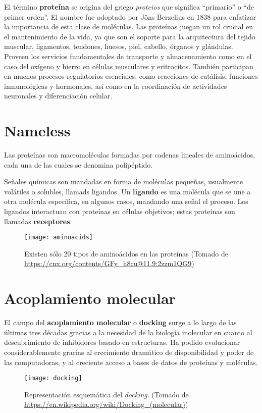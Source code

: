 El término \textbf{proteína} se origina del griego \textit{proteios}
que significa ``primario'' o ``de primer orden''. El nombre fue
adoptado por Jöns Berzelius en 1838 para enfatizar la importancia de
esta clase de moléculas. Las proteínas juegan un rol crucial en el
mantenimiento de la vida, ya que son el soporte para la arquitectura
del tejido muscular, ligamentos, tendones, huesos, piel, cabello,
órganos y glándulas. Proveen los servicios fundamentales de transporte
y almacenamiento como en el caso del oxígeno y hierro en células
musculares y eritrocitos. También participan en muchos procesos
regulatorios esenciales, como reacciones de catálisis, funciones
inmunológicas y hormonales, así como en la coordinación de actividades
neuronales y diferenciación celular.\cite{tamar}

\section{Nameless}
Las proteínas son macromoléculas formadas por cadenas lineales de
aminoácidos, cada una de las cuales se denomina polipéptido.

Señales químicas son mandadas en forma de moléculas pequeñas,
usualmente volátiles o solubles, llamads ligandos. Un \textbf{ligando}
es una molécula que se une a otra molécula específica, en algunos
casos, mandando una señal el proceso. Los ligandos interactuan con
proteínas en células objetivos; estas proteínas son
llamadas \textbf{receptores}.

\begin{figure}[H]
  \texttt{[image: aminoacids]} \centering
  \caption{Existen sólo 20 tipos de aminoácidos en las proteínas
  (Tomado de \url{https://cnx.org/contents/GFy_h8cu@11.9:2zzm1QG9})}
\end{figure}

\section{Acoplamiento molecular}
El campo del \textbf{acoplamiento molecular} o
\textbf{docking} surge a lo largo de las últimas tres décadas gracias a la
necesidad de la biología molecular en cuanto al descubrimiento de
inhibidores basado en estructuras. Ha podido evolucionar
considerablemente gracias al crecimiento dramático de disponibilidad y
poder de las computadoras, y al creciente acceso a bases de datos de
proteínas y moléculas.\cite{kukol}

\begin{figure}[H]
  \texttt{[image: docking]} \centering
  \caption{Representación esquemática del \textit{docking}.  (Tomado de
    \url{https://en.wikipedia.org/wiki/Docking_(molecular)})}
\end{figure}

